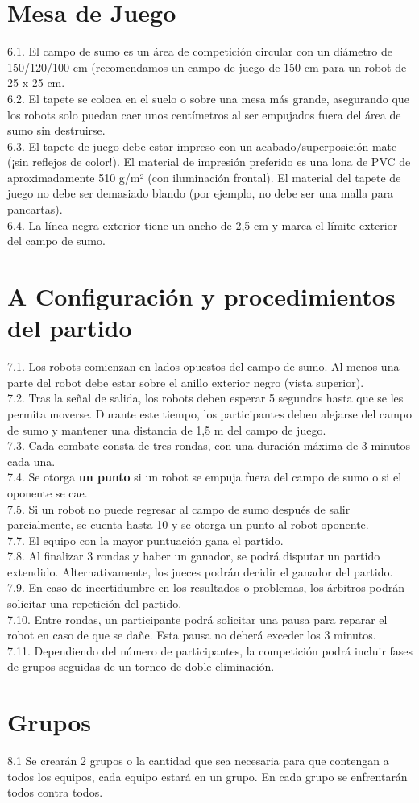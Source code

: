 \documentclass[12pt,a4paper]{article}
\begin{document}
\section{Mesa de Juego}
6.1. El campo de sumo es un área de competición circular con un diámetro de 150/120/100 cm (recomendamos un campo de juego de 150 cm para un robot de 25 x 25 cm. \\
6.2. El tapete se coloca en el suelo o sobre una mesa más grande, asegurando que los robots solo puedan caer unos centímetros al ser empujados fuera del área de sumo sin destruirse. \\
6.3. El tapete de juego debe estar impreso con un acabado/superposición mate (¡sin reflejos de color!). El material de impresión preferido es una lona de PVC de aproximadamente 510 g/m² (con iluminación frontal). El material del tapete de juego no debe ser demasiado blando (por ejemplo, no debe ser una malla para pancartas). \\
6.4. La línea negra exterior tiene un ancho de 2,5 cm y marca el límite exterior del campo de sumo. \\

\section{A Configuración y procedimientos del partido}
7.1. Los robots comienzan en lados opuestos del campo de sumo. Al menos una parte del robot debe estar sobre el anillo exterior negro (vista superior). \\
7.2. Tras la señal de salida, los robots deben esperar 5 segundos hasta que se les permita moverse. Durante este tiempo, los participantes deben alejarse del campo de sumo y mantener una distancia de 1,5 m del campo de juego. \\
7.3. Cada combate consta de tres rondas, con una duración máxima de 3 minutos cada una. \\
7.4. Se otorga \textbf{un punto} si un robot se empuja fuera del campo de sumo o si el oponente se cae. \\
7.5. Si un robot no puede regresar al campo de sumo después de salir parcialmente, se cuenta hasta 10 y se otorga un punto al robot oponente. \\

7.7. El equipo con la mayor puntuación gana el partido. \\
7.8. Al finalizar 3 rondas y haber un ganador, se podrá disputar un partido extendido. Alternativamente, los jueces podrán decidir el ganador del partido. \\
7.9. En caso de incertidumbre en los resultados o problemas, los árbitros podrán solicitar una repetición del partido. \\
7.10. Entre rondas, un participante podrá solicitar una pausa para reparar el robot en caso de que se dañe. Esta pausa no deberá exceder los 3 minutos. \\
7.11. Dependiendo del número de participantes, la competición podrá incluir fases de grupos seguidas de un torneo de doble eliminación.

\section{Grupos}
8.1 Se crearán 2 grupos o la cantidad que sea necesaria para que contengan a todos los equipos, cada equipo estará en un grupo. En cada grupo se enfrentarán todos contra todos.
\end{document}
